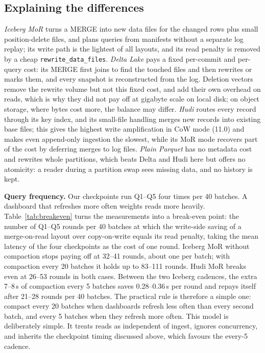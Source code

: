\documentclass[conference]{IEEEtran}
\begin{document}
\subsection{Explaining the differences}
\emph{Iceberg MoR} turns a MERGE into new data files for the changed rows plus small position-delete files, and plans
queries from manifests without a separate log replay; its write path is the lightest of all layouts, and its read
penalty is removed by a cheap \texttt{rewrite\_data\_files}. \emph{Delta Lake} pays a fixed per-commit and per-query
cost: its MERGE first joins to find the touched files and then rewrites or marks them, and every snapshot is
reconstructed from the log. Deletion vectors remove the rewrite volume but not this fixed cost, and add their own
overhead on reads, which is why they did not pay off at gigabyte scale on local disk; on object storage, where
bytes cost more, the balance may differ. \emph{Hudi} routes every record through its key index, and its small-file
handling merges new records into existing base files; this gives the highest write amplification in CoW mode
(11.0) and makes even append-only ingestion the slowest, while its MoR mode recovers part of the cost by deferring
merges to log files. \emph{Plain Parquet} has no metadata cost and rewrites whole partitions, which beats Delta and
Hudi here but offers no atomicity: a reader during a partition swap sees missing data, and no history is kept.

\textbf{Query frequency.} Our checkpoints run Q1--Q5 four times per 40 batches. A dashboard that refreshes more often
weights reads more heavily. Table~\ref{tab:breakeven} turns the measurements into a break-even point: the number of Q1--Q5 rounds
per 40 batches at which the write-side saving of a merge-on-read layout over copy-on-write equals its read penalty, taking the mean
latency of the four checkpoints as the cost of one round. Iceberg MoR without compaction stops paying off at 32--41 rounds, about
one per batch; with compaction every 20 batches it holds up to 83--111 rounds. Hudi MoR breaks even at 26--53 rounds in both cases.
Between the two Iceberg cadences, the extra 7--8\,s of compaction every 5 batches saves 0.28--0.36\,s per round and repays itself
after 21--28 rounds per 40 batches. The practical rule is therefore a simple one: compact every 20 batches when dashboards refresh
less often than every second batch, and every 5 batches when they refresh more often. This model is deliberately simple. It
treats reads as independent of ingest, ignores concurrency, and inherits the checkpoint timing discussed above, which favours the
every-5 cadence.
\end{document}
